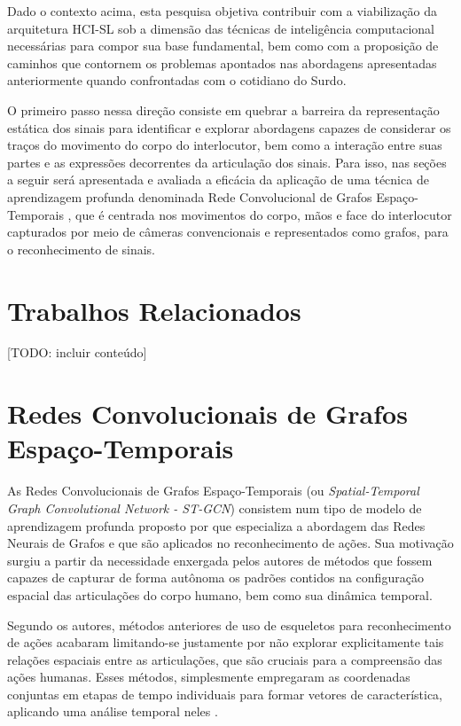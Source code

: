Dado o contexto acima, esta pesquisa objetiva contribuir com a viabilização da arquitetura HCI-SL sob a dimensão das técnicas de inteligência computacional necessárias para compor sua base fundamental, bem como com a proposição de caminhos que contornem os problemas apontados nas abordagens apresentadas anteriormente quando confrontadas com o cotidiano do Surdo. 

O primeiro passo nessa direção consiste em quebrar a barreira da representação estática dos sinais para identificar e explorar abordagens capazes de considerar os traços do movimento do corpo do interlocutor, bem como a interação entre suas partes e as expressões decorrentes da articulação dos sinais. Para isso, nas seções a seguir será apresentada e avaliada a eficácia da aplicação de uma técnica de aprendizagem profunda denominada Rede Convolucional de Grafos Espaço-Temporais \cite{st-gcn-2018}, que é centrada nos movimentos do corpo, mãos e face do interlocutor capturados por meio de câmeras convencionais e representados como grafos, para o reconhecimento de sinais. 


\section{Trabalhos Relacionados} %

[TODO: incluir conteúdo]


\section{Redes Convolucionais de Grafos Espaço-Temporais} %

As Redes Convolucionais de Grafos Espaço-Temporais (ou \textit{Spatial-Temporal Graph Convolutional Network - ST-GCN}) consistem num tipo de modelo de aprendizagem profunda proposto por \cite{st-gcn-2018} que especializa a abordagem das Redes Neurais de Grafos e que são aplicados no reconhecimento de ações. Sua motivação surgiu a partir da necessidade enxergada pelos autores de métodos que fossem capazes de capturar de forma autônoma os padrões contidos na configuração espacial das articulações do corpo humano, bem como sua dinâmica temporal.

Segundo os autores, métodos anteriores de uso de esqueletos para reconhecimento de ações acabaram limitando-se justamente por não explorar explicitamente tais relações espaciais entre as articulações, que são cruciais para a compreensão das ações humanas. Esses métodos, simplesmente empregaram as coordenadas conjuntas em etapas de tempo individuais para formar vetores de característica, aplicando uma análise temporal neles \cite{st-gcn-2018, wang-2012, fernando-2015}.

